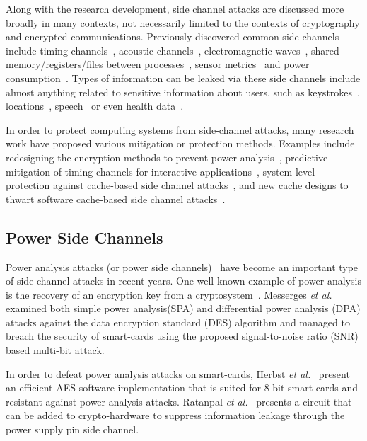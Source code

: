 \documentclass{sig-alternate}
\begin{document}
Along with the research development, side channel attacks are discussed more broadly in many contexts, not necessarily limited to the contexts of cryptography and encrypted communications. Previously discovered common side channels include timing channels~\cite{wray1991analysis, gianvecchio2007detecting, cabuk2004ip, Bortz:2007, Chen:2010, Kopf:2010, Zhang:2012}, acoustic channels~\cite{Zhuang:2009, Das:2014}, electromagnetic waves~\cite{agrawal2003side, Vuagnoux:2009}, shared memory/registers/files between processes~\cite{Qian:2012, jana:2012, zhou:2013, Zhang:2009}, sensor metrics~\cite{Xu:2012, Miluzzo:2012, placeraider-ndss13, schlegel:2011} and power consumption~\cite{kocher1999differential, MichalevskyNSB15}. Types of information can be leaked via these side channels include almost anything related to sensitive information about users, such as keystrokes~\cite{Killourhy:2009}, locations~\cite{MichalevskyNSB15}, speech~\cite{michalevsky2014gyrophone} or even health data~\cite{Chen:2010}.

In order to protect computing systems from side-channel attacks, many research work have proposed various mitigation or protection methods. Examples include redesigning the encryption methods to prevent power analysis~\cite{moller2001securing, brier2002weierstrass}, predictive mitigation of timing channels for interactive applications~\cite{zhang2011predictive}, system-level protection against cache-based side channel attacks~\cite{kim2012stealthmem}, and new cache designs to thwart software cache-based side channel attacks~\cite{wang2007new}.


\subsection{Power Side Channels}
Power analysis attacks (or power side channels)~\cite{brier2004correlation} have become an important type of side channel attacks in recent years. One well-known example of power analysis is the recovery of an encryption key from a cryptosystem~\cite{kocher1999differential, kocher:introduction}. Messerges \emph{et al.}~\cite{messerges2002examining, messerges1999power} examined both simple power analysis(SPA) and differential power analysis (DPA) attacks against the data encryption standard (DES) algorithm and managed to breach the security of smart-cards using the proposed signal-to-noise ratio (SNR) based multi-bit attack.\cite{mangard2008power}

In order to defeat power analysis attacks on smart-cards, Herbst \emph{et al.}~\cite{ herbst2006aes} present an efficient AES software implementation that is suited for 8-bit smart-cards and resistant against power analysis attacks. Ratanpal \emph{et al.}~\cite{ratanpal2004chip} presents a circuit that can be added to crypto-hardware to suppress information leakage through the power supply pin side channel.
\end{document}
